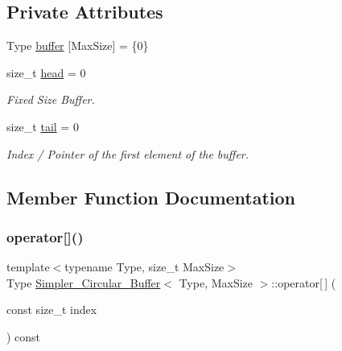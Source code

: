 \subsection*{Private Attributes}
\begin{DoxyCompactItemize}
\item 
Type \hyperlink{classSimpler__Circular__Buffer_a05808047d226985470e02e84b44bee9a}{buffer} \mbox{[}Max\+Size\mbox{]} = \{0\}
\item 
size\+\_\+t \hyperlink{classSimpler__Circular__Buffer_aa6fea0e7b9d4b57aa825dfe11aec3c25}{head} = 0
\begin{DoxyCompactList}\small\item\em Fixed Size Buffer. \end{DoxyCompactList}\item 
size\+\_\+t \hyperlink{classSimpler__Circular__Buffer_a2833e67d4d6cfae68e71306037015642}{tail} = 0
\begin{DoxyCompactList}\small\item\em Index / Pointer of the first element of the buffer. \end{DoxyCompactList}\end{DoxyCompactItemize}


\subsection{Member Function Documentation}
\mbox{\label{classSimpler__Circular__Buffer_a4ce53bc8ad0d231e9d013c771191696a}} 
\subsubsection{\texorpdfstring{operator[]()}{operator[]()}}
{\footnotesize\ttfamily template$<$typename Type, size\+\_\+t Max\+Size$>$ \\
Type \hyperlink{classSimpler__Circular__Buffer}{Simpler\+\_\+\+Circular\+\_\+\+Buffer}$<$ Type, Max\+Size $>$\+::operator\mbox{[}$\,$\mbox{]} (\begin{DoxyParamCaption}\item[{const size\+\_\+t}]{index }\end{DoxyParamCaption}) const\hspace{0.3cm}{\ttfamily [inline]}}



